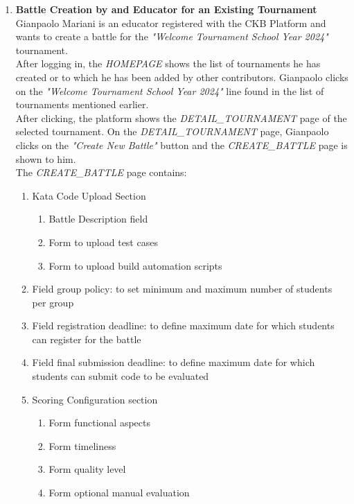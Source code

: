\begin{enumerate}
	\item \textbf{Battle Creation by and Educator for an Existing Tournament}\\
	      Gianpaolo Mariani is an educator registered with the CKB Platform and wants to create a battle for the \emph{"Welcome Tournament School Year 2024"} tournament.\\
	      After logging in, the \emph{HOMEPAGE} shows the list of tournaments he has created or to which he has been added by other contributors. Gianpaolo clicks on the \emph{"Welcome
		      Tournament School Year 2024"} line found in the list of tournaments mentioned earlier.\\
	      After clicking, the platform shows the \emph{DETAIL\_TOURNAMENT} page of the selected tournament.
	      On the \emph{DETAIL\_TOURNAMENT} page, Gianpaolo clicks on the \emph{"Create New Battle"} button and the \emph{CREATE\_BATTLE} page is shown to him.\\
	      The \emph{CREATE\_BATTLE} page contains:

	      \begin{enumerate}
		      \item Kata Code Upload Section
		            \begin{enumerate}
			            \item Battle Description field
			            \item Form to upload test cases
			            \item Form to upload build automation scripts
		            \end{enumerate}
		      \item Field group policy: to set minimum and maximum number of students per group
		      \item Field registration deadline: to define maximum date for which students can register for the battle
		      \item Field final submission deadline: to define maximum date for which students can submit code to be evaluated
		      \item Scoring Configuration section

		            \begin{enumerate}
			            \item Form functional aspects
			            \item Form timeliness
			            \item Form quality level
			            \item Form optional manual evaluation
		            \end{enumerate}



\end{enumerate}
\end{enumerate}
